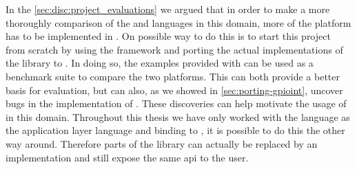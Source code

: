 In the \autoref{sec:disc:project_evaluations} we argued that in order to make a more thoroughly comparison of the {\C} and {\rust} languages in this domain, more of the platform has to be implemented in {\rust}.
On possible way to do this is to start this project from scratch by using the  framework and porting the actual implementations of the {\emlib} library to {\rust}.
In doing so, the examples provided with {\emlib} can be used as a benchmark suite to compare the two platforms.
This can both provide a better basis for evaluation, but can also, as we showed in \autoref{sec:porting-gpioint}, uncover bugs in the {\C} implementation of {\emlib}.
These discoveries can help motivate the usage of {\rust} in this domain.
Throughout this thesis we have only worked with the {\rust} language as the application layer language and binding to {\C}, it is possible to do this the other way around.
Therefore parts of the {\emlib} library can actually be replaced by an {\rust} implementation and still expose the same \gls{api} to the user.
